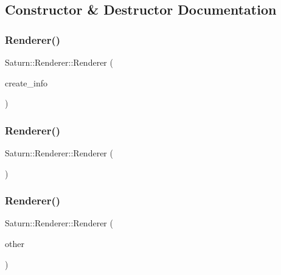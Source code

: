 \subsection{Constructor \& Destructor Documentation}
\mbox{\label{class_saturn_1_1_renderer_a15cfd7d5ff3e992daebf52b81e6f3168}} 
\subsubsection{\texorpdfstring{Renderer()}{Renderer()}\hspace{0.1cm}{\footnotesize\ttfamily [1/3]}}
{\footnotesize\ttfamily Saturn\+::\+Renderer\+::\+Renderer (\begin{DoxyParamCaption}\item[{\mbox{\hyperlink{struct_saturn_1_1_renderer_1_1_create_info}{Create\+Info}}}]{create\+\_\+info }\end{DoxyParamCaption})}

\mbox{\label{class_saturn_1_1_renderer_ad83d9c451cfdcb522e67909fb5b8f41b}} 
\subsubsection{\texorpdfstring{Renderer()}{Renderer()}\hspace{0.1cm}{\footnotesize\ttfamily [2/3]}}
{\footnotesize\ttfamily Saturn\+::\+Renderer\+::\+Renderer (\begin{DoxyParamCaption}\item[{\mbox{\hyperlink{class_saturn_1_1_renderer}{Renderer}} const \&}]{ }\end{DoxyParamCaption})\hspace{0.3cm}{\ttfamily [delete]}}

\mbox{\label{class_saturn_1_1_renderer_a4ef1880dcbcd08a0577bf94848685e96}} 
\subsubsection{\texorpdfstring{Renderer()}{Renderer()}\hspace{0.1cm}{\footnotesize\ttfamily [3/3]}}
{\footnotesize\ttfamily Saturn\+::\+Renderer\+::\+Renderer (\begin{DoxyParamCaption}\item[{\mbox{\hyperlink{class_saturn_1_1_renderer}{Renderer}} \&\&}]{other }\end{DoxyParamCaption})}

